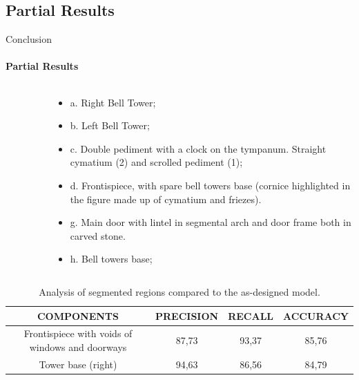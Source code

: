 \documentclass{beamer}
\begin{document}
\subsection{Partial Results}
\begin{frame}{Conclusion}
\framesubtitle{Partial Results}
    \justifying
    \begin{columns}
        \begin{column}{0.47\textwidth}
            \begin{figure}
              \vspace{-0.3cm}
              \centering
               {}
             \end{figure}
        \end{column}
        \begin{column}{0.7\textwidth}
        \tiny\begin{itemize}
            \item[] a. Right Bell Tower;
            \item[] b. Left Bell Tower; 
            \item[] c. Double pediment with a clock on the tympanum. Straight cymatium (2) and scrolled pediment (1); 
            \item[] d. Frontispiece, with spare bell towers base (cornice highlighted in the figure made up of cymatium and friezes).
            \item[] g. Main door with lintel in segmental arch and door frame both in carved stone.
            \item[] h. Bell towers base;
            \end{itemize}
        \end{column}
    \end{columns}
    \vspace{-0.3cm}
    \tiny{
    \begin{table}
        \caption{Analysis of segmented regions compared to the as-designed model.}
        \centering
        \begin{center}
        \begin{tabular}{|c|c|c|c|}
              \hline
              COMPONENTS & PRECISION & RECALL &  ACCURACY\\
              \hline
              Frontispiece with voids of windows and doorways  &  87,73 & 93,37 & 85,76 \\
              \hline
              Tower base (right) & 94,63 & 86,56 & 84,79 \\

\end{tabular}
\end{center}
\end{table}}
\end{frame}
\end{document}
